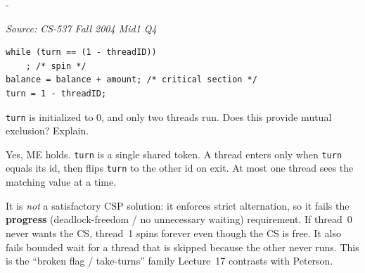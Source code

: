 \documentclass[11pt,a4paper]{article}
\makeatletter
\newcommand{\keepspace}[1]{\par\penalty-100\begingroup
  \setlength{\dimen@}{#1}\dimen@ii\pagegoal\advance\dimen@ii-\pagetotal
  \ifdim\dimen@>\dimen@ii\ifdim\dimen@ii>\z@\vfil\fi\break\fi\endgroup}
\newcounter{qn}[section]
\newenvironment{Qn}[4]{%
  \refstepcounter{qn}\keepspace{7\baselineskip}%
  \begin{tcolorbox}[qboxstyle, title={Q\thesection.\theqn\ \ [#1 \textbar\ #2]\ \ #4}]%
  {\footnotesize\color{g3}\textit{Source: #3}}\par\smallskip%
}{%
  \end{tcolorbox}%
}
\newenvironment{Sol}{%
  \begin{tcolorbox}[sboxstyle, title={Solution}]%
}{%
  \end{tcolorbox}\vspace{0.35em}%
}
\makeatother
\begin{document}
\begin{Qn}{Medium-Hard}{Lect 17}{CS-537 Fall 2004 Mid1 Q4}{Strict-alternation lock: ME without progress?}
\begin{lstlisting}[numbers=none]
while (turn == (1 - threadID))
    ; /* spin */
balance = balance + amount; /* critical section */
turn = 1 - threadID;
\end{lstlisting}

\texttt{turn} is initialized to 0, and only two threads run. Does this provide mutual exclusion? Explain.
\end{Qn}
\begin{Sol}
Yes, ME holds. \texttt{turn} is a single shared token. A thread enters only when \texttt{turn} equals its id, then flips \texttt{turn} to the other id on exit. At most one thread sees the matching value at a time.

It is \emph{not} a satisfactory CSP solution: it enforces strict alternation, so it fails the \textbf{progress} (deadlock-freedom / no unnecessary waiting) requirement. If thread~0 never wants the CS, thread~1 spins forever even though the CS is free. It also fails bounded wait for a thread that is skipped because the other never runs. This is the ``broken flag / take-turns'' family Lecture~17 contrasts with Peterson.
\end{Sol}
\end{document}
